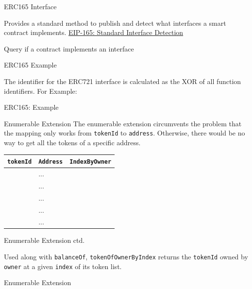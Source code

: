 \documentclass[handout]{beamer}
\begin{document}
\begin{frame}{ERC165 Interface}

Provides a standard method to publish and detect what interfaces a smart contract implements. \link \href{https://eips.ethereum.org/EIPS/eip-165}{EIP-165: Standard Interface Detection}
\vspace{1em}
	\begin{samplecode}{Query if a contract implements an interface}
			
	\end{samplecode}
\end{frame}


\begin{frame}{ERC165 Example}

The identifier for the ERC721 interface is calculated as the XOR of all function identifiers.
For Example:

\begin{samplecode}{ERC165: Example}
		
\end{samplecode}
\end{frame}

\begin{frame}{Enumerable Extension}
The enumerable extension circumvents the problem that the mapping only works from \texttt{tokenId} to \texttt{address}. Otherwise, there would be no way to get all the tokens of a specific address.
\vspace{0.5em}
		\begin{table}
			\begin{tabular}{clc}
			\hline \hline
			\texttt{tokenId} & \texttt{Address} & \texttt{IndexByOwner}\\
			\hline
			\color{focus}{0} & \color{focus}{0x0901}... & \color{focus}{0} \\
			\color{mint}{1} & \color{mint}{0x7A25}... & \color{mint}{0} \\
			\color{focus}{2} & \color{focus}{0x0901}... & \color{focus}{1}\\
			\color{focus}{3} & \color{focus}{0x0901}... & \color{focus}{2}\\
			\color{darkmint}{4} & \color{darkmint}{0xce9b}... & \color{darkmint}{0} \\
			\hline \hline
			\end{tabular}
		\end{table}
\end{frame}

\begin{frame}{Enumerable Extension ctd.}

	Used along with \texttt{balanceOf}, \texttt{tokenOfOwnerByIndex} returns the \texttt{tokenId} owned by \texttt{owner} at a given \texttt{index} of its token list.\vspace{0.5em}
 
	\begin{samplecode}{Enumerable Extension}
		
	\end{samplecode}
\end{frame}
\end{document}
